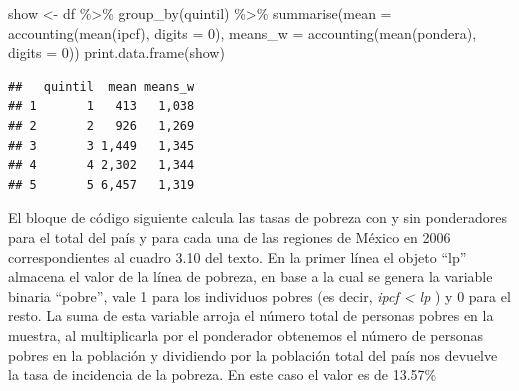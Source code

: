 \documentclass[
]{book}
\newenvironment{Shaded}{\begin{snugshade}}{\end{snugshade}}
\newcommand{\AttributeTok}[1]{\textcolor[rgb]{0.77,0.63,0.00}{#1}}
\newcommand{\CommentTok}[1]{\textcolor[rgb]{0.56,0.35,0.01}{\textit{#1}}}
\newcommand{\DecValTok}[1]{\textcolor[rgb]{0.00,0.00,0.81}{#1}}
\newcommand{\DocumentationTok}[1]{\textcolor[rgb]{0.56,0.35,0.01}{\textbf{\textit{#1}}}}
\newcommand{\FloatTok}[1]{\textcolor[rgb]{0.00,0.00,0.81}{#1}}
\newcommand{\FunctionTok}[1]{\textcolor[rgb]{0.00,0.00,0.00}{#1}}
\newcommand{\NormalTok}[1]{#1}
\newcommand{\OtherTok}[1]{\textcolor[rgb]{0.56,0.35,0.01}{#1}}
\newcommand{\SpecialCharTok}[1]{\textcolor[rgb]{0.00,0.00,0.00}{#1}}
\begin{document}
\begin{Shaded}
\begin{Highlighting}[]
\NormalTok{show }\OtherTok{\textless{}{-}}\NormalTok{ df }\SpecialCharTok{\%\textgreater{}\%} \FunctionTok{group\_by}\NormalTok{(quintil) }\SpecialCharTok{\%\textgreater{}\%} \FunctionTok{summarise}\NormalTok{(}\AttributeTok{mean =} \FunctionTok{accounting}\NormalTok{(}\FunctionTok{mean}\NormalTok{(ipcf), }\AttributeTok{digits =} \DecValTok{0}\NormalTok{),}
                                               \AttributeTok{means\_w =} \FunctionTok{accounting}\NormalTok{(}\FunctionTok{mean}\NormalTok{(pondera), }\AttributeTok{digits =} \DecValTok{0}\NormalTok{))}
\FunctionTok{print.data.frame}\NormalTok{(show)}
\end{Highlighting}
\end{Shaded}

\begin{verbatim}
##   quintil  mean means_w
## 1       1   413   1,038
## 2       2   926   1,269
## 3       3 1,449   1,345
## 4       4 2,302   1,344
## 5       5 6,457   1,319
\end{verbatim}

El bloque de código siguiente calcula las tasas de pobreza con y sin ponderadores para el total del país y para cada una de las regiones de México en 2006 correspondientes al cuadro 3.10 del texto. En la primer línea el objeto ``lp'' almacena el valor de la línea de pobreza, en base a la cual se genera la variable binaria ``pobre'', vale 1 para los individuos pobres (es decir, \emph{ipcf \textless{} lp} ) y 0 para el resto. La suma de esta variable arroja el número total de personas pobres en la muestra, al multiplicarla por el ponderador obtenemos el número de personas pobres en la población y dividiendo por la población total del país nos devuelve la tasa de incidencia de la pobreza. En este caso el valor es de 13.57\%

\begin{Shaded}
\end{Shaded}
\end{document}
